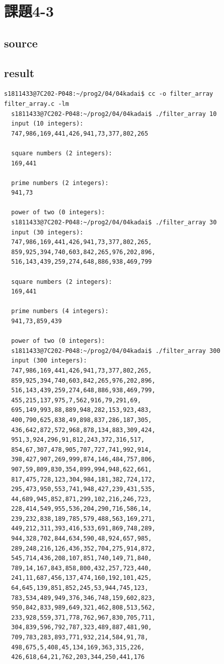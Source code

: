 \documentclass[10pt,a4paper]{jsarticle}
\begin{document}
\section{課題4-3}
\subsection{source}


\subsection{result}

\begin{lstlisting}[basicstyle=\ttfamily\footnotesize,frame=single]
  s1811433@7C202-P048:~/prog2/04/04kadai$ cc -o filter_array filter_array.c -lm
  s1811433@7C202-P048:~/prog2/04/04kadai$ ./filter_array 10
  input (10 integers):
  747,986,169,441,426,941,73,377,802,265

  square numbers (2 integers):
  169,441

  prime numbers (2 integers):
  941,73

  power of two (0 integers):
  s1811433@7C202-P048:~/prog2/04/04kadai$ ./filter_array 30
  input (30 integers):
  747,986,169,441,426,941,73,377,802,265,
  859,925,394,740,603,842,265,976,202,896,
  516,143,439,259,274,648,886,938,469,799

  square numbers (2 integers):
  169,441

  prime numbers (4 integers):
  941,73,859,439

  power of two (0 integers):
  s1811433@7C202-P048:~/prog2/04/04kadai$ ./filter_array 300
  input (300 integers):
  747,986,169,441,426,941,73,377,802,265,
  859,925,394,740,603,842,265,976,202,896,
  516,143,439,259,274,648,886,938,469,799,
  455,215,137,975,7,562,916,79,291,69,
  695,149,993,88,889,948,282,153,923,483,
  400,790,625,838,49,898,837,286,187,305,
  436,642,872,572,968,878,134,883,309,424,
  951,3,924,296,91,812,243,372,316,517,
  854,67,307,478,905,707,727,741,992,914,
  398,427,907,269,999,874,146,484,757,806,
  907,59,809,830,354,899,994,948,622,661,
  817,475,728,123,304,984,181,382,724,172,
  295,473,950,553,741,948,427,239,431,535,
  44,689,945,852,871,299,102,216,246,723,
  228,414,549,955,536,204,290,716,586,14,
  239,232,838,189,785,579,488,563,169,271,
  449,212,311,393,416,533,691,869,748,289,
  944,328,702,844,634,590,48,924,657,985,
  289,248,216,126,436,352,704,275,914,872,
  545,714,436,208,107,851,740,149,71,840,
  789,14,167,843,858,800,432,257,723,440,
  241,11,687,456,137,474,160,192,101,425,
  64,645,139,851,852,245,53,944,745,123,
  783,534,489,949,376,346,748,159,602,823,
  950,842,833,989,649,321,462,808,513,562,
  233,928,559,371,778,762,967,830,705,711,
  304,839,596,792,787,323,489,887,481,90,
  709,783,283,893,771,932,214,584,91,78,
  498,675,5,408,45,134,169,363,315,226,
  426,618,64,21,762,203,344,250,441,176


\end{lstlisting}
\end{document}
